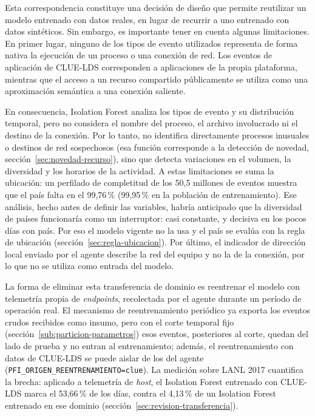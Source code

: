 Esta correspondencia constituye una decisión de diseño que permite reutilizar un modelo entrenado con datos reales, en lugar de recurrir a uno entrenado con datos sintéticos. Sin embargo, es importante tener en cuenta algunas limitaciones. En primer lugar, ninguno de los tipos de evento utilizados representa de forma nativa la ejecución de un proceso o una conexión de red. Los eventos de aplicación de CLUE-LDS corresponden a aplicaciones de la propia plataforma, mientras que el acceso a un recurso compartido públicamente se utiliza como una aproximación semántica a una conexión saliente.

En consecuencia, Isolation Forest analiza los tipos de evento y su distribución temporal, pero no considera el nombre del proceso, el archivo involucrado ni el destino de la conexión. Por lo tanto, no identifica directamente procesos inusuales o destinos de red sospechosos (esa función corresponde a la detección de novedad, sección~\ref{sec:novedad-recurso}), sino que detecta variaciones en el volumen, la diversidad y los horarios de la actividad. A estas limitaciones se suma la ubicación: un perfilado de completitud de los 50,5 millones de eventos muestra que el país falta en el 99,76\,\% (99,95\,\% en la población de entrenamiento). Ese análisis, hecho antes de definir las variables, habría anticipado que la diversidad de países funcionaría como un interruptor: casi constante, y decisiva en los pocos días con país. Por eso el modelo vigente no la usa y el país se evalúa con la regla de ubicación (sección~\ref{sec:regla-ubicacion}). Por último, el indicador de dirección local enviado por el agente describe la red del equipo y no la de la conexión, por lo que no se utiliza como entrada del modelo.

La forma de eliminar esta transferencia de dominio es reentrenar el modelo con telemetría propia de \emph{endpoints}, recolectada por el agente durante un período de operación real. El mecanismo de reentrenamiento periódico ya exporta los eventos crudos recibidos como insumo, pero con el corte temporal fijo (sección~\ref{sub:particion-parametros}) esos eventos, posteriores al corte, quedan del lado de prueba y no entran al entrenamiento; además, el reentrenamiento con datos de CLUE-LDS se puede aislar de los del agente (\texttt{PFI\_\allowbreak{}ORIGEN\_\allowbreak{}REENTRENAMIENTO=\allowbreak{}clue}). La medición sobre LANL 2017 cuantifica la brecha: aplicado a telemetría de \emph{host}, el Isolation Forest entrenado con CLUE-LDS marca el 53,66\,\% de los días, contra el 4,13\,\% de un Isolation Forest entrenado en ese dominio (sección~\ref{sec:revision-transferencia}).

